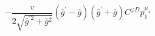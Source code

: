 %
\begin{dmath*}
%
  -  \frac{v}{2 \sqrt{{\bar g}^{\prime 2} + {\bar g}{}^2}}({\bar g}^\prime - {\bar g}{}) ({\bar g}^\prime + {\bar g}{}) C^{ \varphi  D} p_1^{\mu_4}
%
\end{dmath*}
%
